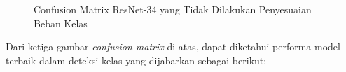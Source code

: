 \begin{figure}[hbtp]
	\centering
	\qquad
	\qquad
	\caption{Confusion Matrix ResNet-34 yang Tidak Dilakukan Penyesuaian Beban Kelas}
	\label{fig:confRes34}
\end{figure}

Dari ketiga gambar \emph{confusion matrix} di atas, dapat diketahui performa model terbaik dalam deteksi kelas yang dijabarkan sebagai berikut:


